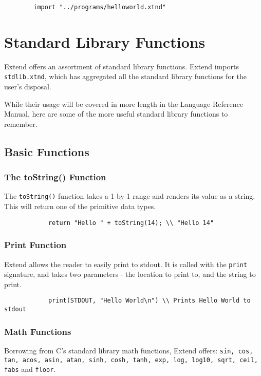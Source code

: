 	\begin{lstlisting}
		import "../programs/helloworld.xtnd"
	\end{lstlisting}

\section{Standard Library Functions}
Extend offers an assortment of standard library functions. Extend imports \texttt{stdlib.xtnd}, which has aggregated all the standard library functions for the user's disposal.

\medskip \noindent
While their usage will be covered in more length in the Language Reference Manual, here are some of the more useful standard library functions to remember.
	\subsection{Basic Functions}
		\subsubsection{The toString() Function}
		The \texttt{toString()} function takes a 1 by 1 range and renders its value as a string. This will return one of the primitive data types.

		\begin{lstlisting}
			return "Hello " + toString(14); \\ "Hello 14"
		\end{lstlisting}

		\subsubsection{Print Function}
		Extend allows the reader to easily print to stdout. It is called with the \texttt{print} signature, and takes two parameters - the location to print to, and the string to print.

		\begin{lstlisting}
			print(STDOUT, "Hello World\n") \\ Prints Hello World to stdout
		\end{lstlisting}

		\subsubsection{Math Functions}
		Borrowing from C's standard library math functions, Extend offers: \texttt{sin, cos, tan, acos, asin, atan, sinh, cosh, tanh, exp, log, log10, sqrt, ceil, fabs} and \texttt{floor}.

